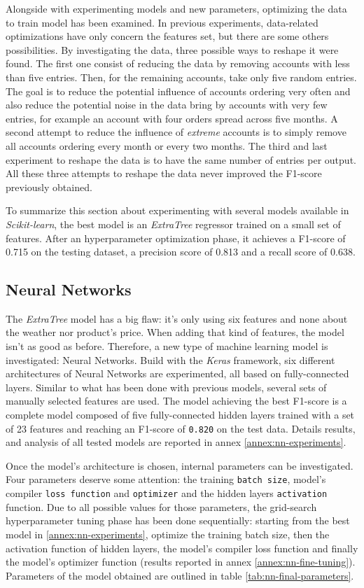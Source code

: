 Alongside with experimenting models and new parameters, optimizing the data to train model has been examined. In previous experiments, data-related optimizations have only concern the features set, but there are some others possibilities. By investigating the data, three possible ways to reshape it were found. 
The first one consist of reducing the data by removing accounts with less than five entries. Then, for the remaining accounts, take only five random entries. The goal is to reduce the potential influence of accounts ordering very often and also reduce the potential noise in the data bring by accounts with very few entries, for example an account with four orders spread across five months. A second attempt to reduce the influence of \textit{extreme} accounts is to simply remove all accounts ordering every month or every two months. The third and last experiment to reshape the data is to have the same number of entries per output. All these three attempts to reshape the data never improved the F1-score previously obtained.

To summarize this section about experimenting with several models available in \textit{Scikit-learn}, the best model is an \textit{ExtraTree} regressor trained on a small set of features. After an hyperparameter optimization phase, it achieves a F1-score of 0.715 on the testing dataset, a precision score of 0.813 and a recall score of 0.638.


\subsection{Neural Networks}
The \textit{ExtraTree} model has a big flaw: it's only using six features and none about the weather nor product's price. When adding that kind of features, the model isn't as good as before. Therefore, a new type of machine learning model is investigated: Neural Networks. Build with the \textit{Keras} framework, six different architectures of Neural Networks are experimented, all based on fully-connected layers. Similar to what has been done with previous models, several sets of manually selected features are used. The model achieving the best F1-score is a complete model composed of five fully-connected hidden layers trained with a set of 23 features and reaching an F1-score of \texttt{0.820} on the test data. Details results, and analysis of all tested models are reported in annex \ref{annex:nn-experiments}.

Once the model's architecture is chosen, internal parameters can be investigated. Four parameters deserve some attention: the training \texttt{batch size}, model's compiler \texttt{loss function} and \texttt{optimizer} and the hidden layers \texttt{activation} function. Due to all possible values for those parameters, the grid-search hyperparameter tuning phase has been done sequentially: starting from the best model in \ref{annex:nn-experiments}, optimize the training batch size, then the activation function of hidden layers, the model's compiler loss function and finally the model's optimizer function (results reported in annex \ref{annex:nn-fine-tuning}). Parameters of the model obtained are outlined in table \ref{tab:nn-final-parameters}.

